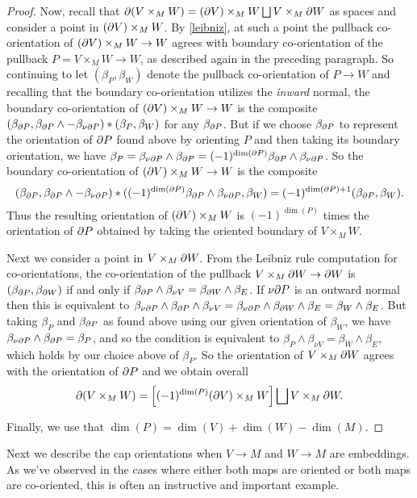\begin{proof}
	Now, recall that $\partial(V\times_MW)=(\partial V)\times_M W \bigsqcup V\times_M\partial W$ as spaces and consider a point in $(\partial V)\times_M W$.
	By \cref{leibniz}, at such a point the pullback co-orientation of $(\partial V)\times_M W\to W$ agrees with boundary co-orientation of the pullback $P=V\times_M W\to W$, as described again in the preceding paragraph.
	So continuing to let $(\beta_P,\beta_W)$ denote the pullback co-orientation of $P\to W$ and recalling that the boundary co-orientation utilizes the \textit{inward} normal, the boundary co-orientation of $(\partial V)\times_M W\to W$ is the composite $(\beta_{\partial P}, \beta_{\partial P}\wedge -\beta_{\nu\partial P})*(\beta_P,\beta_W)$ for any $\beta_{\partial P}$.
	But if we choose $\beta_{\partial P}$ to represent the orientation of $\partial P$ found above by orienting $P$ and then taking its boundary orientation, we have $\beta_P=\beta_{\nu\partial P}\wedge \beta_{\partial P}=(-1)^{\dim(\partial P)}\beta_{\partial P}\wedge \beta_{\nu\partial P}$.
	So the boundary co-orientation of $(\partial V)\times_M W\to W$ is the composite
	$$(\beta_{\partial P}, \beta_{\partial P}\wedge -\beta_{\nu\partial P})*((-1)^{\dim(\partial P)}\beta_{\partial P}\wedge \beta_{\nu\partial P},\beta_W)=(-1)^{\dim(\partial P)+1}(\beta_{\partial P},\beta_W).$$
	Thus the resulting orientation of $(\partial V)\times_M W$ is $(-1)^{\dim(P)}$ times the orientation of $\partial P$ obtained by taking the oriented boundary of $V\times_M W$.

	Next we consider a point in $V\times_M\partial W$.
	From the Leibniz rule computation for co-orientations, the co-orientation of the pullback $V\times_M\partial W\to \partial W$ is $(\beta_{\partial P},\beta_{\partial W})$ if and only if $\beta_{\partial P}\wedge \beta_{\nu V}=\beta_{\partial W}\wedge \beta_E$.
	If $\nu\partial P$ is an outward normal then this is equivalent to $\beta_{\nu\partial P}\wedge \beta_{\partial P}\wedge \beta_{\nu V}=\beta_{\nu\partial P}\wedge \beta_{\partial W}\wedge \beta_E= \beta_W\wedge \beta_E$.
	But taking $\beta_P$ and $\beta_{\partial P}$ as found above using our given orientation of $\beta_W$, we have $\beta_{\nu\partial P}\wedge \beta_{\partial P}=\beta_P$, and so the condition is equivalent to $\beta_{P}\wedge \beta_{\nu V}= \beta_W\wedge \beta_E$, which holds by our choice above of $\beta_P$.
	So the orientation of $V\times_M\partial W$ agrees with the orientation of $\partial P$ and we obtain overall $$\partial(V\times_MW)=\left[(-1)^{\dim(P)} (\partial V)\times_M W\right] \bigsqcup V\times_M\partial W.$$

	Finally, we use that $\dim(P)=\dim(V)+\dim(W)-\dim(M)$.
\end{proof}

Next we describe the cap orientations when $V\to M$ and $W \to M$ are embeddings.
As we've observed in the cases where either both maps are oriented or both maps are co-oriented, this is often an instructive and important example.

